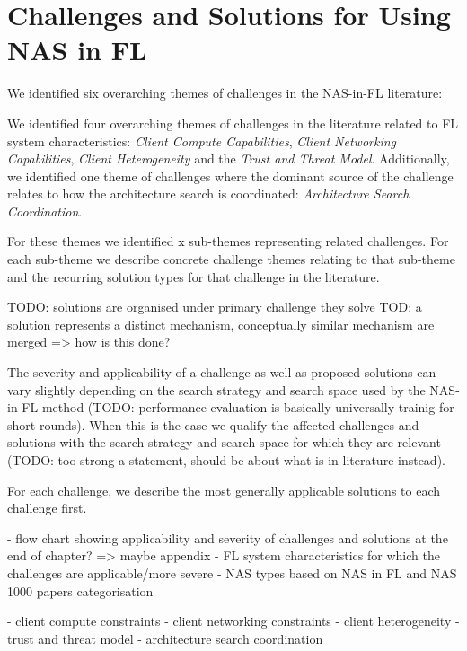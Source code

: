 \chapter{Challenges and Solutions for Using NAS in FL}\label{chapter:nas_in_fl_ch_and_sol}


We identified six overarching themes of challenges in the NAS-in-FL literature: 

We identified four overarching themes of challenges in the literature related to FL system characteristics: \textit{Client Compute Capabilities}, \textit{Client Networking Capabilities}, \textit{Client Heterogeneity} and the \textit{Trust and Threat Model}. Additionally, we identified one theme of challenges where the dominant source of the challenge relates to how the architecture search is coordinated: \textit{Architecture Search Coordination}.

For these themes we identified x sub-themes representing related challenges. For each sub-theme we describe concrete challenge themes relating to that sub-theme and the recurring solution types for that challenge in the literature.

TODO: solutions are organised under primary challenge they solve
TOD: a solution represents a distinct mechanism, conceptually similar mechanism are merged => how is this done?

The severity and applicability of a challenge as well as proposed solutions can vary slightly depending on the search strategy and search space used by the NAS-in-FL method (TODO: performance evaluation is basically universally trainig for short rounds). When this is the case we qualify the affected challenges and solutions with the search strategy and search space for which they are relevant (TODO: too strong a statement, should be about what is in literature instead).

For each challenge, we describe the most generally applicable solutions to each challenge first.


- flow chart showing applicability and severity of challenges and solutions at the end of chapter? => maybe appendix
- FL system characteristics for which the challenges are applicable/more severe
- NAS types based on NAS in FL and NAS 1000 papers categorisation

- client compute constraints
- client networking constraints
- client heterogeneity
- trust and threat model
- architecture search coordination